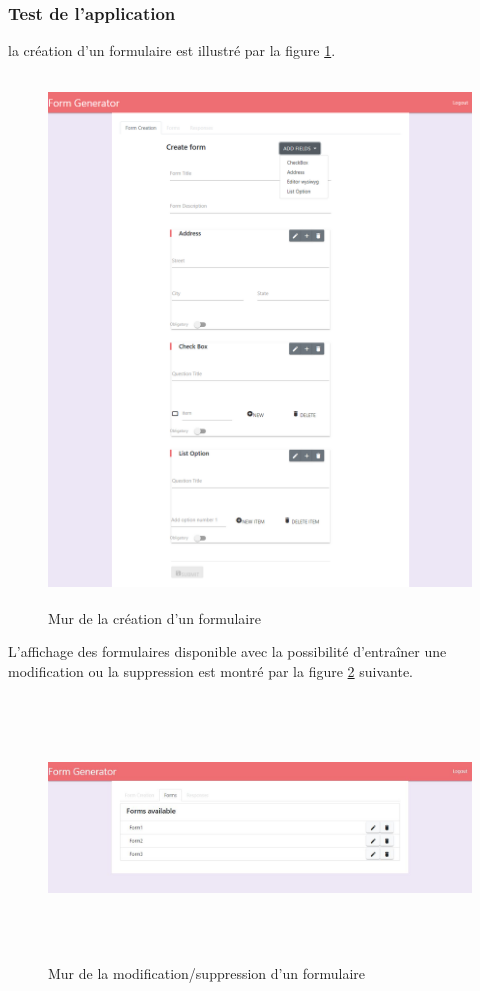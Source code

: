 \subsubsection{Test de l'application }  
la création d'un formulaire est illustré par la figure \ref{fig1}.
    \begin{figure} [H]
    \centering
         \begin{center}
             \includegraphics [width=16cm,height=14cm] {SprintImage/Formulaire.png}
            \caption{Mur de la création d'un formulaire}
            \label{fig1}
        \end{center}
    \end{figure}
\newpage  
L'affichage des formulaires disponible avec la possibilité d'entraîner une modification ou la suppression est montré par la figure \ref{fig2} suivante.
   \begin{figure} [H]
    \centering
         \begin{center}
             \includegraphics [width=16cm,height=7cm] {SprintImage/FormAvailable.JPG}
            \caption{Mur de la modification/suppression d'un formulaire}
            \label{fig2}
        \end{center}
    \end{figure}
